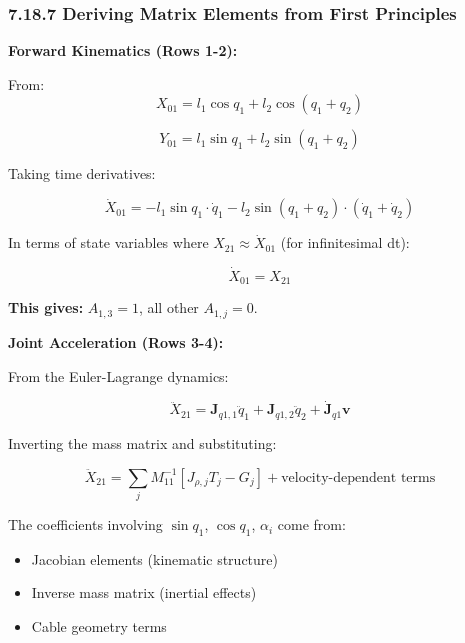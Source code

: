 \subsubsection{7.18.7 Deriving Matrix Elements from First Principles}

\textbf{Forward Kinematics (Rows 1-2):}

From:
\begin{equation}
X_{01} = l_1 \cos q_1 + l_2 \cos(q_1+q_2)
\end{equation}

\begin{equation}
Y_{01} = l_1 \sin q_1 + l_2 \sin(q_1+q_2)
\end{equation}

Taking time derivatives:

\begin{equation}
\dot{X}_{01} = -l_1 \sin q_1 \cdot \dot{q}_1 - l_2 \sin(q_1+q_2) \cdot (\dot{q}_1 + \dot{q}_2)
\end{equation}

In terms of state variables where $X_{21} \approx \dot{X}_{01}$ (for infinitesimal dt):

\begin{equation}
\dot{X}_{01} = X_{21}
\end{equation}

\textbf{This gives:} $A_{1,3} = 1$, all other $A_{1,j} = 0$.

\textbf{Joint Acceleration (Rows 3-4):}

From the Euler-Lagrange dynamics:

\begin{equation}
\ddot{X}_{21} = \mathbf{J}_{q1,1} \ddot{q}_1 + \mathbf{J}_{q1,2} \ddot{q}_2 + \dot{\mathbf{J}}_{q1} \mathbf{v}
\end{equation}

Inverting the mass matrix and substituting:

\begin{equation}
\ddot{X}_{21} = \sum_j M^{-1}_{11} [J_{\rho,j} T_j - G_j] + \text{velocity-dependent terms}
\end{equation}

The coefficients involving $\sin q_1$, $\cos q_1$, $\alpha_i$ come from:
\begin{itemize}
    \item Jacobian elements (kinematic structure)
    \item Inverse mass matrix (inertial effects)
    \item Cable geometry terms
\end{itemize}


